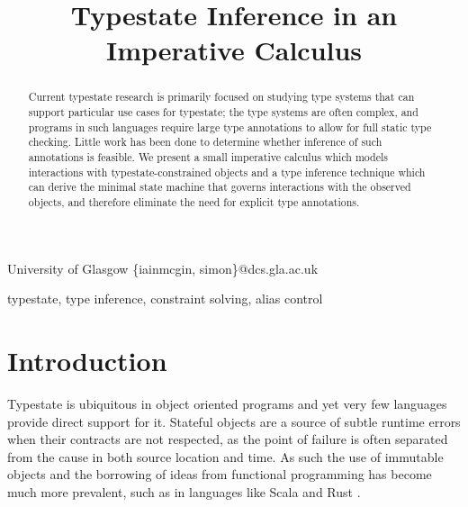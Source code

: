 \documentclass[preprint]{sigplanconf}
\begin{document}
\copyrightdata{[to be supplied]} 


\title{Typestate Inference in an Imperative Calculus}

           {University of Glasgow}
           {\{iainmcgin, simon\}@dcs.gla.ac.uk}

\maketitle

\begin{abstract}
Current typestate research is primarily focused on studying
type systems that can support particular use cases for typestate;
the type systems are often complex, and programs in such languages 
require large type annotations to allow for full static type checking. Little
work has been done to determine whether inference of such annotations is 
feasible. We present a small imperative calculus which
models interactions with typestate-constrained objects and a type inference
technique which can derive the minimal state machine that governs interactions
with the observed objects, and therefore eliminate the need for
explicit type annotations.
\end{abstract}


\keywords
typestate, type inference, constraint solving, alias control

\section{Introduction}

Typestate is ubiquitous in object oriented programs \cite{Beckman2011} and yet
very few languages provide direct support for it. Stateful objects are a source
of subtle runtime errors when their contracts are not respected, as the
point of failure is often separated from the cause in both source location
and time. As such the use of immutable objects and the 
borrowing of ideas from functional programming has become much more prevalent, 
such as in languages like Scala and Rust \cite{Rust}.
\end{document}
